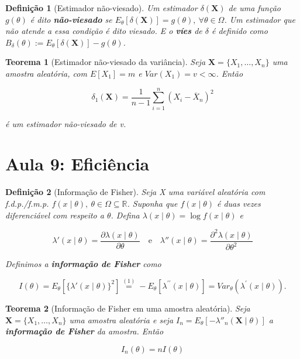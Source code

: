 \documentclass{article}
\newtheorem{theorem}{Teorema}
\newtheorem{definition}{Definição}
\begin{document}
\begin{definition}[Estimador não-viesado]
Um estimador $\delta(\textbf{X})$ de uma função $g(\theta)$ é dito \textbf{não-viesado} se $E_\theta[\delta(\textbf{X})] = g(\theta), \ \forall \theta \in \Omega$. Um estimador que não atende a essa condição é dito viesado. E o \textbf{víes} de $\delta$ é definido como $B_\delta(\theta) := E_\theta[\delta(\textbf{X})] - g(\theta)$.
\end{definition}

\begin{theorem}[Estimador não-viesado da variância]
Seja $\textbf{X} = \{ X_1, \ldots, X_n \}$ uma amostra aleatória, com $E[X_1] = m$ e $Var(X_1) = v < \infty$. Então

$$\delta_1(\textbf{X}) = \frac{1}{n - 1}\sum_{i = 1}^n (X_i - \overline{X}_n)^2$$

é um estimador não-viesado de v.
\end{theorem}

\section*{Aula 9: Eficiência}
\label{s9}
\begin{definition}[Informação de Fisher]\label{def:fis}
Seja X uma variável aleatória com f.d.p./f.m.p. $f(x \mid \theta), \ \theta \in \Omega \subseteq \mathbb{R}$. Suponha que $f(x \mid \theta)$ é duas vezes diferenciável com respeito a $\theta$. Defina $\lambda (x \mid \theta) = \log f(x \mid \theta)$ e

\begin{equation}
    \lambda' (x \mid \theta) = \frac{\partial \lambda (x \mid \theta)}{\partial \theta} \quad \mathrm{e} \quad \lambda'' (x \mid \theta) = \frac{\partial^2 \lambda(x \mid \theta)}{\partial \theta^2}
\end{equation}

Definimos a \textbf{informação de Fisher} como

\begin{equation}
    I(\theta) = E_\theta \left [ \{ \lambda'(x \mid \theta) \}^2 \right ] \stackrel{\mathrm{(1)}}{=} -E_\theta\left[\lambda^{\prime\prime}(x \mid \theta)\right] = Var_\theta\left(\lambda^{\prime}(x\mid \theta) \right).
\end{equation}
\end{definition}

\begin{theorem}[Informação de Fisher em uma amostra aleatória]
Seja $\textbf{X} = \{ X_1, \ldots, X_n \}$ uma amostra aleatória e seja $I_n = E_\theta [- \lambda''_n (\textbf{X} \mid \theta)]$ a \textbf{informação de Fisher} da amostra. Então

$$I_n(\theta) = n I(\theta)$$
\end{theorem}
\end{document}
